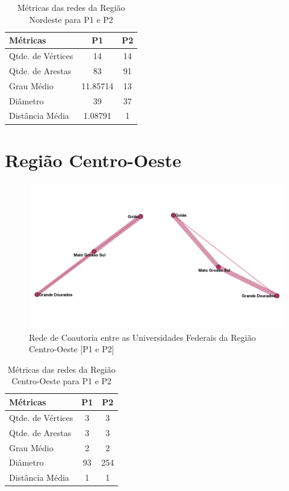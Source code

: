 \documentclass[12pt]{article}
\begin{document}


\begin{table}[H]
\centering
\begin{tabular}{lS[table-format=3.5]S[table-format=3.5]}
\hline
{} 
\textbf{Métricas} & \textbf{P1} & \textbf{P2} \\ \hline
Qtde. de Vértices & 14     & 14           \\ \hline
Qtde. de Arestas  & 83     & 91          \\ \hline
Grau Médio        & 11.85714     & 13     \\ \hline
Diâmetro          & 39     & 37           \\ \hline
Distância Média   & 1.08791      & 1     \\ \hline
\end{tabular}
\caption{Métricas das redes da Região Nordeste para P1 e P2}
\end{table}


\section{Região Centro-Oeste}


\begin{figure}[H]
\centering
\includegraphics[scale=0.6]{images/centro_oeste.pdf}
\caption{Rede de Coautoria entre as Universidades Federais da Região Centro-Oeste [P1 e P2]}
\label{rede-centro}
\end{figure}


\begin{table}[H]
\centering
\begin{tabular}{lS[table-format=3.5]S[table-format=3.5]}
\hline
{} 
\textbf{Métricas} & \textbf{P1} & \textbf{P2} \\ \hline
Qtde. de Vértices & 3           & 3           \\ \hline
Qtde. de Arestas  & 3           & 3          \\ \hline
Grau Médio        & 2           & 2          \\ \hline
Diâmetro          & 93          & 254         \\ \hline
Distância Média   & 1           & 1            \\ \hline
\end{tabular}
\caption{Métricas das redes da Região Centro-Oeste para P1 e P2}
\end{table}
\end{document}
